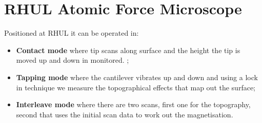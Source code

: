 \section{RHUL Atomic Force Microscope}
 Positioned at RHUL it can be operated in:
 \begin{itemize}
 	\item \textbf{Contact mode} where tip scans along surface and the height the tip is moved up and down in monitored. ;
 	\item \textbf{Tapping mode} where the cantilever vibrates up and down and using a lock in technique we measure the topographical effects that map out the surface;
 	\item \textbf{Interleave mode} where there are two scans, first one for the topography, second that uses the initial scan data to work out the magnetisation.
 \end{itemize}

